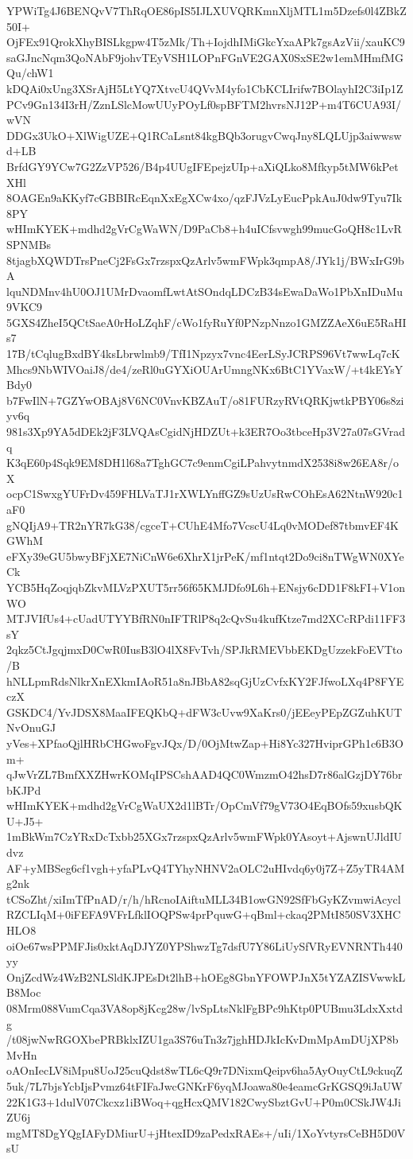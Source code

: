 YPWiTg4J6BENQvV7ThRqOE86pIS5IJLXUVQRKmnXljMTL1m5Dzefs0l4ZBkZ50I+
OjFEx91QrokXhyBISLkgpw4T5zMk/Th+IojdhIMiGkcYxaAPk7gsAzVii/xauKC9
saGJncNqm3QoNAbF9johvTEyVSH1LOPnFGnVE2GAX0SxSE2w1emMHmfMGQu/chW1
kDQAi0xUng3XSrAjH5LtYQ7XtvcU4QVvM4yfo1CbKCLIrifw7BOlayhI2C3iIp1Z
PCv9Gn134I3rH/ZznLSlcMowUUyPOyLf0spBFTM2hvrsNJ12P+m4T6CUA93I/wVN
DDGx3UkO+XlWigUZE+Q1RCaLsnt84kgBQb3orugvCwqJny8LQLUjp3aiwwswd+LB
BrfdGY9YCw7G2ZzVP526/B4p4UUgIFEpejzUIp+aXiQLko8Mfkyp5tMW6kPetXHl
8OAGEn9aKKyf7cGBBIRcEqnXxEgXCw4xo/qzFJVzLyEucPpkAuJ0dw9Tyu7Ik8PY
wHImKYEK+mdhd2gVrCgWaWN/D9PaCb8+h4uICfsvwgh99mucGoQH8c1LvRSPNMBs
8tjagbXQWDTrsPneCj2FsGx7rzspxQzArlv5wmFWpk3qmpA8/JYk1j/BWxIrG9bA
lquNDMnv4hU0OJ1UMrDvaomfLwtAtSOndqLDCzB34sEwaDaWo1PbXnIDuMu9VKC9
5GXS4ZheI5QCtSaeA0rHoLZqhF/cWo1fyRuYf0PNzpNnzo1GMZZAeX6uE5RaHIs7
17B/tCqlugBxdBY4ksLbrwlmb9/TfI1Npzyx7vnc4EerLSyJCRPS96Vt7wwLq7cK
Mhcs9NbWIVOaiJ8/de4/zeRl0uGYXiOUArUmngNKx6BtC1YVaxW/+t4kEYsYBdy0
b7FwIlN+7GZYwOBAj8V6NC0VnvKBZAuT/o81FURzyRVtQRKjwtkPBY06s8ziyv6q
981s3Xp9YA5dDEk2jF3LVQAsCgidNjHDZUt+k3ER7Oo3tbceHp3V27a07sGVradq
K3qE60p4Sqk9EM8DH1l68a7TghGC7c9enmCgiLPahvytnmdX2538i8w26EA8r/oX
ocpC1SwxgYUFrDv459FHLVaTJ1rXWLYnffGZ9sUzUsRwCOhEsA62NtnW920c1aF0
gNQIjA9+TR2nYR7kG38/cgceT+CUhE4Mfo7VcscU4Lq0vMODef87tbmvEF4KGWhM
eFXy39eGU5bwyBFjXE7NiCnW6e6XhrX1jrPeK/mf1ntqt2Do9ci8nTWgWN0XYeCk
YCB5HqZoqjqbZkvMLVzPXUT5rr56f65KMJDfo9L6h+ENsjy6cDD1F8kFI+V1onWO
MTJVIfUs4+cUadUTYYBfRN0nIFTRlP8q2cQvSu4kufKtze7md2XCcRPdi11FF3sY
2qkz5CtJgqjmxD0CwR0IusB3lO4lX8FvTvh/SPJkRMEVbbEKDgUzzekFoEVTto/B
hNLLpmRdsNlkrXnEXkmIAoR51a8nJBbA82sqGjUzCvfxKY2FJfwoLXq4P8FYEczX
GSKDC4/YvJDSX8MaaIFEQKbQ+dFW3cUvw9XaKrs0/jEEeyPEpZGZuhKUTNvOnuGJ
yVes+XPfaoQjlHRbCHGwoFgvJQx/D/0OjMtwZap+Hi8Yc327HviprGPh1c6B3Om+
qJwVrZL7BmfXXZHwrKOMqIPSCshAAD4QC0WmzmO42hsD7r86alGzjDY76brbKJPd
wHImKYEK+mdhd2gVrCgWaUX2d1lBTr/OpCmVf79gV73O4EqBOfs59xusbQKU+J5+
1mBkWm7CzYRxDcTxbb25XGx7rzspxQzArlv5wmFWpk0YAsoyt+AjswnUJldIUdvz
AF+yMBSeg6cf1vgh+yfaPLvQ4TYhyNHNV2aOLC2uHIvdq6y0j7Z+Z5yTR4AMg2nk
tCSoZht/xiImTfPnAD/r/h/hRcnoIAiftuMLL34B1owGN92SfFbGyKZvmwiAcycl
RZCLIqM+0iFEFA9VFrLfklIOQPSw4prPquwG+qBml+ckaq2PMtI850SV3XHCHLO8
oiOe67wsPPMFJis0xktAqDJYZ0YPShwzTg7dsfU7Y86LiUySfVRyEVNRNTh440yy
OnjZcdWz4WzB2NLSldKJPEsDt2lhB+hOEg8GbnYFOWPJnX5tYZAZISVwwkLB8Moc
08Mrm088VumCqa3VA8op8jKcg28w/lvSpLtsNklFgBPc9hKtp0PUBmu3LdxXxtdg
/t08jwNwRGOXbePRBklxIZU1ga3S76uTn3z7jghHDJkIcKvDmMpAmDUjXP8bMvHn
oAOnIecLV8iMpu8UoJ25cuQdst8wTL6cQ9r7DNixmQeipv6ha5AyOuyCtL9ckuqZ
5uk/7L7bjsYcbIjsPvmz64tFIFaJwcGNKrF6yqMJoawa80e4eamcGrKGSQ9iJaUW
22K1G3+1dulV07Ckcxz1iBWoq+qgHcxQMV182CwySbztGvU+P0m0CSkJW4JiZU6j
mgMT8DgYQgIAFyDMiurU+jHtexID9zaPedxRAEs+/uIi/1XoYvtyrsCeBH5D0VsU
